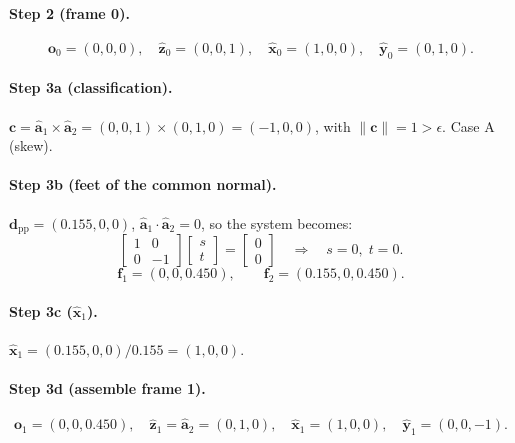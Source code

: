 \documentclass[11pt]{article}
\newcommand{\vect}[1]{\bm{#1}}
\newcommand{\unit}[1]{\hat{\bm{#1}}}
\newcommand{\norm}[1]{\left\|#1\right\|}
\begin{document}
\paragraph{Step 2 (frame 0).}
\[
  \vect{o}_0 = (0, 0, 0), \quad
  \unit{z}_0 = (0, 0, 1), \quad
  \unit{x}_0 = (1, 0, 0), \quad
  \unit{y}_0 = (0, 1, 0).
\]

\paragraph{Step 3a (classification).}
$\vect{c} = \unit{a}_1 \times \unit{a}_2 = (0,0,1) \times (0,1,0) = (-1, 0, 0)$,
with $\norm{\vect{c}} = 1 > \epsilon$. Case A (skew).

\paragraph{Step 3b (feet of the common normal).}
$\vect{d}_{\mathrm{pp}} = (0.155, 0, 0)$, $\unit{a}_1 \cdot \unit{a}_2 = 0$,
so the system becomes:
\[
  \begin{bmatrix} 1 & 0 \\ 0 & -1 \end{bmatrix}
  \begin{bmatrix} s \\ t \end{bmatrix}
  = \begin{bmatrix} 0 \\ 0 \end{bmatrix}
  \quad\Longrightarrow\quad s = 0,\; t = 0.
\]
\[
  \vect{f}_1 = (0, 0, 0.450), \qquad \vect{f}_2 = (0.155, 0, 0.450).
\]

\paragraph{Step 3c ($\unit{x}_1$).}
$\unit{x}_1 = (0.155, 0, 0) / 0.155 = (1, 0, 0)$.

\paragraph{Step 3d (assemble frame 1).}
\[
  \vect{o}_1 = (0, 0, 0.450), \quad
  \unit{z}_1 = \unit{a}_2 = (0, 1, 0), \quad
  \unit{x}_1 = (1, 0, 0), \quad
  \unit{y}_1 = (0, 0, -1).
\]
\end{document}
